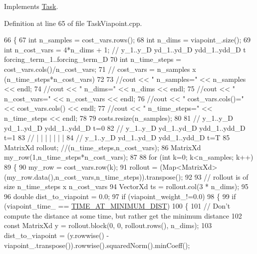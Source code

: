 Implements \hyperlink{classDmpBbo_1_1Task_a6534c0378bdfa540946ce2a02c914417}{Task}.



Definition at line 65 of file Task\+Viapoint.\+cpp.


\begin{DoxyCode}
66 \{
67   \textcolor{keywordtype}{int} n\_samples = cost\_vars.rows();
68   \textcolor{keywordtype}{int} n\_dims = viapoint\_.size();
69   \textcolor{keywordtype}{int} n\_cost\_vars = 4*n\_dims + 1; \textcolor{comment}{// y\_1..y\_D  yd\_1..yd\_D  ydd\_1..ydd\_D  t forcing\_term\_1..forcing\_term\_D}
70   \textcolor{keywordtype}{int} n\_time\_steps = cost\_vars.cols()/n\_cost\_vars;
71   \textcolor{comment}{// cost\_vars  = n\_samples x (n\_time\_steps*n\_cost\_vars)}
72 
73   \textcolor{comment}{//cout << "  n\_samples=" << n\_samples << endl;}
74   \textcolor{comment}{//cout << "  n\_dims=" << n\_dims << endl;}
75   \textcolor{comment}{//cout << "  n\_cost\_vars=" << n\_cost\_vars << endl;}
76   \textcolor{comment}{//cout << "  cost\_vars.cols()=" << cost\_vars.cols() << endl;  }
77   \textcolor{comment}{//cout << "  n\_time\_steps=" << n\_time\_steps << endl;}
78 
79   costs.resize(n\_samples);
80   
81   \textcolor{comment}{// y\_1..y\_D  yd\_1..yd\_D  ydd\_1..ydd\_D  t=0}
82   \textcolor{comment}{// y\_1..y\_D  yd\_1..yd\_D  ydd\_1..ydd\_D  t=1}
83   \textcolor{comment}{//  |    |     |     |      |     |     |}
84   \textcolor{comment}{// y\_1..y\_D  yd\_1..yd\_D  ydd\_1..ydd\_D  t=T}
85   MatrixXd rollout; \textcolor{comment}{//(n\_time\_steps,n\_cost\_vars);}
86   MatrixXd my\_row(1,n\_time\_steps*n\_cost\_vars);
87   
88   \textcolor{keywordflow}{for} (\textcolor{keywordtype}{int} k=0; k<n\_samples; k++)
89   \{
90     my\_row = cost\_vars.row(k);
91     rollout = (Map<MatrixXd>(my\_row.data(),n\_cost\_vars,n\_time\_steps)).transpose();   
92     
93     \textcolor{comment}{// rollout is of size   n\_time\_steps x n\_cost\_vars}
94     VectorXd ts = rollout.col(3 * n\_dims);
95 
96     \textcolor{keywordtype}{double} dist\_to\_viapoint = 0.0;
97     \textcolor{keywordflow}{if} (viapoint\_weight\_!=0.0)
98     \{
99       \textcolor{keywordflow}{if} (viapoint\_time\_ == \hyperlink{classDmpBbo_1_1TaskViapoint_a4cdb8b00e89770014fb33674de175a39}{TIME\_AT\_MINIMUM\_DIST})
100       \{
101         \textcolor{comment}{// Don't compute the distance at some time, but rather get the minimum distance}
102         \textcolor{keyword}{const} MatrixXd y = rollout.block(0, 0, rollout.rows(), n\_dims);
103         dist\_to\_viapoint = (y.rowwise() - viapoint\_.transpose()).rowwise().squaredNorm().minCoeff();

\end{DoxyCode}
